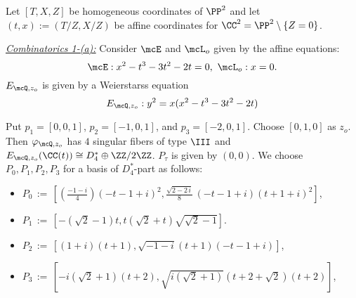 \begin{exmple}[{\bf Combinatorics 1}]\label{ex:comb1} \rm

Let $[T, X, Z]$ be homogeneous coordinates of $\PP^2$ and let
 $(t, x):=(T/Z, X/Z)$ be affine coordinates for $\CC^{2} = \PP^{2} \setminus \{ Z = 0 \} $.

\medskip


\underline{{\sl Combinatorics 1-(a):}}  Consider $\mcE$ and $\mcL_o$ given by the affine equations:
\[
\mcE : x^{2} - t^{3} - 3{t}^{2} - 2t = 0, \,\,
{\mcL}_{o} : x = 0.
\]
$E_{\mcQ, z_o}$ is given by a Weierstarss equation
\[
E_{\mcQ, z_o} : y^2 = x(x^{2} - t^{3} - 3{t}^{2} - 2t)
\]

Put $p_{1}=[0,0,1]$, $p_{2}=[-1, 0, 1]$, and $p_{3}=[-2, 0, 1]$.  Choose $[0, 1, 0]$ as $z_{o}$. Then 
$\varphi_{\mcQ, z_o}$ has $4$ singular fibers of type $\III$ and $E_{\mcQ , z_{o}}(\CC (t)) \cong D_{4}^{\ast} \oplus \ZZ /2 \ZZ$. $P_{\tau}$ is given by $(0, 0)$. We choose  $P_{0}, P_{1}, P_{2}, P_{3}$ for a basis of $D_{4}^{\ast}$-part  as follows:
 \begin{itemize}
 \item $\displaystyle {P_{{0}}\, := \,\left [ \left( \frac{-1-i}4 \right)  \left( -t-1+i \right) ^{2},
 \frac {\sqrt{2-2\,i}}8\, \left( -t-1+i \right)  \left( t+1+i \right) ^{2} \right]}$,


\item  $\displaystyle{ P_{{1}}\, := \, \left [- \left(  \sqrt{2}-1 \right) t,t \left(  \sqrt{2}+t \right)  \sqrt{ \sqrt{2}-1}\right]}$.
\item $\displaystyle {P_{{2}}\, := \,\left [ \left( 1+i \right)  \left( t+1 \right) , \sqrt{-1-i} \left( t+1 \right) 
\mbox{} \left( -t-1+i \right) \right ]}$,

\item  $\displaystyle{ P_{{3}}\, := \, \left [-i \left(  \sqrt{2}+1 \right)  \left( t+2 \right) , \sqrt{i \left(  \sqrt{2}+1 \right) }
 \left( t+2+ \sqrt{2} \right)  \left( t+2 \right) \right ]}$,


\end{itemize}
\end{exmple}
